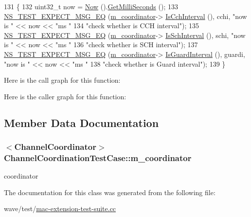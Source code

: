 \begin{DoxyCode}
131 \{
132   uint32\_t now = \hyperlink{group__simulator_gac3635e2e87f7ce316c89290ee1b01d0d}{Now} ().\hyperlink{classns3_1_1Time_aba3428a8b6c4c8d9014ce44145081f34}{GetMilliSeconds} ();
133   \hyperlink{group__testing_ga7304ba46a28d8cf08dfdfd6499cf7068}{NS\_TEST\_EXPECT\_MSG\_EQ} (\hyperlink{classChannelCoordinationTestCase_aa469b580039ced8be2fdd10720594cf2}{m\_coordinator}->
      \hyperlink{classns3_1_1ChannelCoordinator_a8a7e45692213154adb0341ab6de183e4}{IsCchInterval} (), cchi, \textcolor{stringliteral}{"now is "} << now  << \textcolor{stringliteral}{"ms "}
134                          \textcolor{stringliteral}{"check whether is CCH interval"});
135   \hyperlink{group__testing_ga7304ba46a28d8cf08dfdfd6499cf7068}{NS\_TEST\_EXPECT\_MSG\_EQ} (\hyperlink{classChannelCoordinationTestCase_aa469b580039ced8be2fdd10720594cf2}{m\_coordinator}->
      \hyperlink{classns3_1_1ChannelCoordinator_a347bdf5153926f4ee16fb7b202db3121}{IsSchInterval} (), schi, \textcolor{stringliteral}{"now is "} << now  << \textcolor{stringliteral}{"ms "}
136                          \textcolor{stringliteral}{"check whether is SCH interval"});
137   \hyperlink{group__testing_ga7304ba46a28d8cf08dfdfd6499cf7068}{NS\_TEST\_EXPECT\_MSG\_EQ} (\hyperlink{classChannelCoordinationTestCase_aa469b580039ced8be2fdd10720594cf2}{m\_coordinator}->
      \hyperlink{classns3_1_1ChannelCoordinator_a909edb902d2a931970d25ee33f9401c4}{IsGuardInterval} (), guardi, \textcolor{stringliteral}{"now is "} << now  << \textcolor{stringliteral}{"ms "}
138                          \textcolor{stringliteral}{"check whether is Guard interval"});
139 \}
\end{DoxyCode}


Here is the call graph for this function\+:




Here is the caller graph for this function\+:




\subsection{Member Data Documentation}
\subsubsection[{\texorpdfstring{m\+\_\+coordinator}{m_coordinator}}]{$<${\bf Channel\+Coordinator}$>$ Channel\+Coordination\+Test\+Case\+::m\+\_\+coordinator\hspace{0.3cm}{\ttfamily [private]}}\hypertarget{classChannelCoordinationTestCase_aa469b580039ced8be2fdd10720594cf2}{}\label{classChannelCoordinationTestCase_aa469b580039ced8be2fdd10720594cf2}


coordinator 



The documentation for this class was generated from the following file\+:\begin{DoxyCompactItemize}
\item 
wave/test/\hyperlink{mac-extension-test-suite_8cc}{mac-\/extension-\/test-\/suite.\+cc}\end{DoxyCompactItemize}
